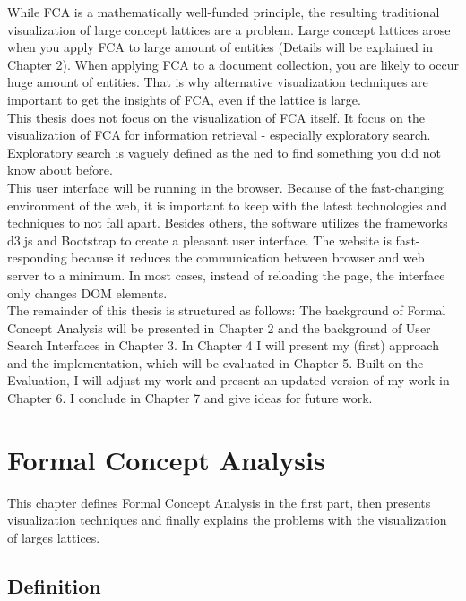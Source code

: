 \documentclass[11pt]{report}
\begin{document}
 While FCA is a mathematically well-funded principle, the resulting traditional visualization of large concept lattices are a problem. Large concept lattices arose when you apply FCA to large amount of entities (Details will be explained in Chapter 2). When applying FCA to a document collection, you are likely to occur huge amount of entities. That is why alternative visualization techniques are important to get the insights of FCA, even if the lattice is large. \\
 
 This thesis does not focus on the visualization of FCA itself. It focus on the visualization of FCA for information retrieval - especially exploratory search. Exploratory search is vaguely defined as the ned to find something you did not know about before. \\
 
This user interface will be running in the browser. Because of the fast-changing environment of the web, it is important to keep with the latest technologies and techniques to not fall apart. Besides others, the software utilizes the frameworks d3.js and Bootstrap to create a pleasant user interface. The website is fast-responding because it reduces the communication between browser and web server to a minimum. In most cases, instead of reloading the page, the interface only changes DOM elements. \\ 
    
 The remainder of this thesis is structured as follows: The background of Formal Concept Analysis will be presented in Chapter 2 and the background of User Search Interfaces in Chapter 3. In Chapter 4 I will present my (first) approach and the implementation, which will be evaluated in Chapter 5. Built on the Evaluation, I will adjust my work and present an updated version of my work in Chapter 6. I conclude in Chapter 7 and give ideas for future work.
 
\chapter{Formal Concept Analysis}

This chapter defines Formal Concept Analysis in the first part, then presents visualization techniques and finally explains the problems with the visualization of larges lattices.

\section{Definition}
\end{document}

